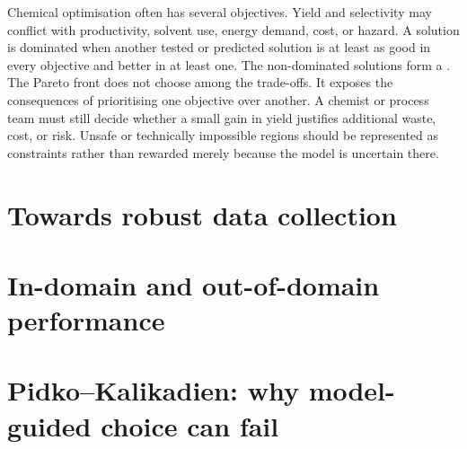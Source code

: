 Chemical optimisation often has several objectives.
Yield and selectivity may conflict with productivity, solvent use, energy demand, cost, or hazard.
A solution is dominated when another tested or predicted solution is at least as good in every objective and better in at least one.
The non-dominated solutions form a .
The Pareto front does not choose among the trade-offs.
It exposes the consequences of prioritising one objective over another.
A chemist or process team must still decide whether a small gain in yield justifies additional waste, cost, or risk.
Unsafe or technically impossible regions should be represented as constraints rather than rewarded merely because the model is uncertain there.


\section{Towards robust data collection}




\section{In-domain and out-of-domain performance}



\section{Pidko--Kalikadien: why model-guided choice can fail}

